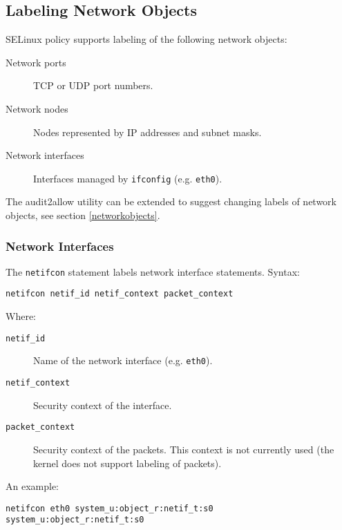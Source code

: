 \subsection{Labeling Network Objects}

SELinux policy supports labeling of the following network objects:
\begin{description}
    \item [Network ports] TCP or UDP port numbers.
    \item [Network nodes] Nodes represented by IP addresses and subnet masks.
    \item [Network interfaces] Interfaces managed by \texttt{ifconfig} (e.g.
        \texttt{eth0}).
\end{description}
The audit2allow utility can be extended to suggest changing labels of network
objects, see section \ref{networkobjects}.

\subsubsection{Network Interfaces}
The \texttt{netifcon} statement labels network interface statements. Syntax:
\begin{lstlisting}[language=te]
netifcon netif_id netif_context packet_context
\end{lstlisting}
Where:
\begin{description}
    \item [\texttt{netif\_id}] Name of the network interface (e.g.
        \texttt{eth0}).
    \item [\texttt{netif\_context}] Security context of the interface.
    \item [\texttt{packet\_context}] Security context of the packets. This
        context is not currently used (the kernel does not support labeling of
        packets).
\end{description}
An example:
\begin{lstlisting}[language=te]
netifcon eth0 system_u:object_r:netif_t:s0 system_u:object_r:netif_t:s0
\end{lstlisting}


